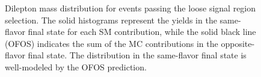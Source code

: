 \begin{figure}[hbt]
  \begin{center}
    \caption{Dilepton mass distribution for events passing the loose signal region selection. The solid histograms represent the yields in the same-flavor
      final state for each SM contribution, while the solid black line (OFOS) indicates the sum of the MC contributions in the opposite-flavor final state.
      The \ttbar distribution in the same-flavor final state is well-modeled by the OFOS prediction.}
    \label{fig:ttbar}
  \end{center}
\end{figure}

%





